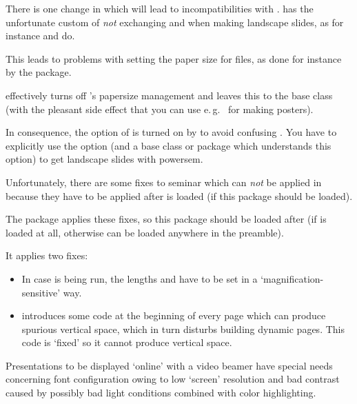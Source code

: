 \documentclass[12pt]{scrartcl}
\let\newslide=\relax
\begin{document}
There is one change in  which will lead to incompatibilities with .  has the
unfortunate custom of \emph{not} exchanging  and  when making landscape
slides, as for instance  and  do.

This leads to problems with setting the paper size for  files, as done for instance by the 
package.

 effectively turns off 's papersize management and leaves this to the base class (with the
pleasant side effect that you can use e.\,g.\  for making posters).

In consequence, the  option of  is turned on by  to avoid confusing
. You have to explicitly use the  option (and a base class or package which understands
this option) to get landscape slides with powersem.

\newslide

Unfortunately, there are some fixes to seminar which can \emph{not} be applied in  because they have to
be applied after  is loaded (if this package should be loaded).

The package  applies these fixes, so this package should be loaded after  (if
 is loaded at all, otherwise  can be loaded anywhere in the preamble).

\newslide

It applies two fixes:
\begin{itemize}
\item In case  is being run, the lengths  and  have to
  be set in a `magnification-sensitive' way.

\item {} introduces some code at the beginning of every page which can produce spurious vertical space,
  which in turn disturbs building dynamic pages. This code is `fixed' so it cannot produce vertical space.
\end{itemize}

\newslide

\label{Sec:TPslifonts}
Presentations to be displayed `online' with a video beamer have special needs concerning font configuration owing to low
`screen' resolution and bad contrast caused by possibly bad light conditions combined with color highlighting.
\end{document}
